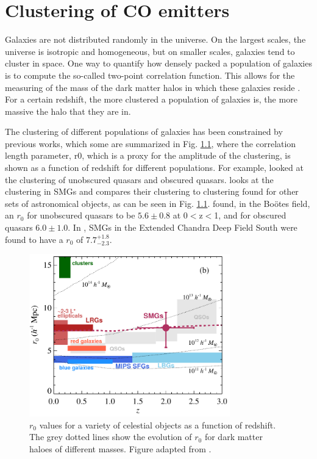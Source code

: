 \chapter{Clustering of CO emitters}

Galaxies are not distributed randomly in the universe. On the largest scales, the universe is isotropic and homogeneous, but on smaller scales, galaxies tend to cluster in space. One way to quantify how densely packed a population of galaxies is to compute the so-called two-point correlation function. This allows for the measuring of the mass of the dark matter halos in which these galaxies reside \cite{hickox2011clustering}. For a certain redshift, the more clustered a population of galaxies is, the more massive the halo that they are in.

The clustering of different populations of galaxies has been constrained by previous works, which some are summarized in Fig. \ref{fig:Hickox_compare}, where the correlation length parameter, r0, which is a proxy for the amplitude of the clustering, is shown as a function of redshift for different populations. For example, \cite{hickox2011clustering} looked at the clustering of unobscured quasars and obscured quasars. \cite{10.1111/j.1365-2966.2011.20303.x} looks at the clustering in SMGs and compares their clustering to clustering found for other sets of astronomical objects, as can be seen in Fig. \ref{fig:Hickox_compare}. \cite{hickox2011clustering} found, in the Bo\"otes field, an $r_0$ for unobscured quasars to be $5.6 \pm 0.8$ at 0$<$z$<$1, and for obscured quasars $6.0 \pm 1.0 $. In \cite{10.1111/j.1365-2966.2011.20303.x}, SMGs in the Extended Chandra Deep Field South were found to have a $r_0$ of $7.7_{-2.3}^{+1.8}$.

\begin{figure}[!htb]
\centering \includegraphics[width=87mm]{clustering/Hickox2012_Compare.png}
\caption{$r_0$ values for a variety of celestial objects as a function of redshift. The grey dotted lines show the evolution of $r_0$ for dark matter haloes of different masses. Figure adapted from \cite{10.1111/j.1365-2966.2011.20303.x}.}
\label{fig:Hickox_compare}
\end{figure}

